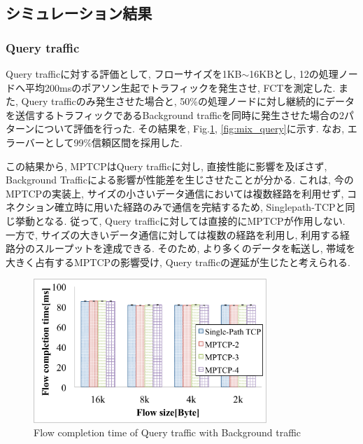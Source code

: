 \subsection{シミュレーション結果}

\subsubsection{Query traffic}
Query trafficに対する評価として, フローサイズを1KB$\sim$16KBとし, 
12の処理ノードへ平均200msのポアソン生起でトラフィックを発生させ, FCTを測定した.
また, Query trafficのみ発生させた場合と, 50\%の処理ノードに対し継続的にデータを送信するトラフィックであるBackground
trafficを同時に発生させた場合の2パターンについて評価を行った.
その結果を, Fig.\ref{fig:pure_query}, \ref{fig:mix_query}に示す.
なお, エラーバーとして99\%信頼区間を採用した.

この結果から, MPTCPはQuery trafficに対し, 直接性能に影響を及ぼさず, Background
Trafficによる影響が性能差を生じさせたことが分かる.
これは, 今のMPTCPの実装上, サイズの小さいデータ通信においては複数経路を利用せず, コネクション確立時に用いた経路のみで通信を完結するため,
Singlepath-TCPと同じ挙動となる. 
従って, Query trafficに対しては直接的にMPTCPが作用しない. 
一方で, サイズの大きいデータ通信に対しては複数の経路を利用し, 利用する経路分のスループットを達成できる. 
そのため, より多くのデータを転送し, 帯域を大きく占有するMPTCPの影響受け, Query trafficの遅延が生じたと考えられる. 

\begin{figure}[t]
    \begin{center}
    \includegraphics[autoebb, width=250pt]{./img/pure_query.pdf}
    \caption{Flow completion time of Query traffic with Background
    traffic}
    \label{fig:pure_query}
    \end{center}
\end{figure}

